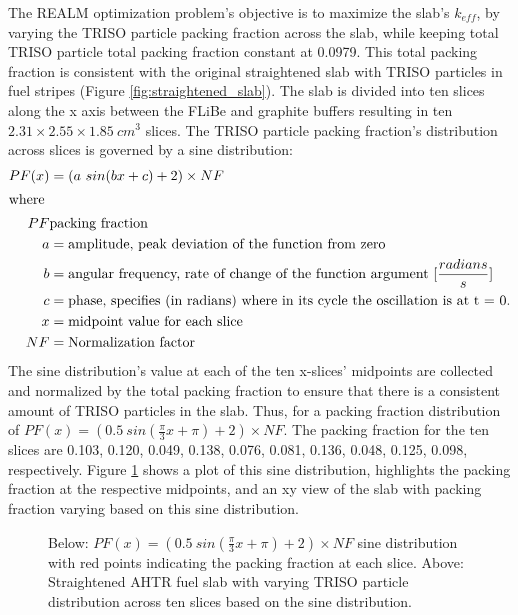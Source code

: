 The \gls{REALM} optimization problem's objective is to maximize the slab's 
$k_{eff}$, by varying the \gls{TRISO} particle packing fraction across the slab,
while keeping total \gls{TRISO} particle total packing fraction constant at 0.0979. 
This total packing fraction is consistent with the original straightened slab with 
TRISO particles in fuel stripes (Figure \ref{fig:straightened_slab}). 
The slab is divided into ten slices along the x axis between the \gls{FLiBe} and 
graphite buffers resulting in ten $2.31 \times 2.55 \times 1.85\ cm^3$ slices. 
The \gls{TRISO} particle packing fraction's distribution across slices is 
governed by a sine distribution: 
\begin{align}
    PF(x) &= (a\ sin(bx + c) + 2) \times NF\\
    \intertext{where}
    PF & \mbox{packing fraction} \nonumber \\ 
    a &= \mbox{amplitude, peak deviation of the function from zero} \nonumber \\
    b &= \mbox{angular frequency, rate of change of the function argument } [\frac{radians}{s}] \nonumber \\
    c &= \mbox{phase, specifies (in radians) where in its cycle the oscillation is at t = 0.} \nonumber \\
    x &= \mbox{midpoint value for each slice} \nonumber \\
    NF &= \mbox{Normalization factor} \nonumber
\end{align}
The sine distribution's value at each of the ten x-slices' midpoints are collected and 
normalized by the total packing fraction to ensure that there is a consistent 
amount of \gls{TRISO} particles in the slab. 
Thus, for a packing fraction distribution of 
$PF(x) = (0.5\ sin(\frac{\pi}{3}x + \pi) + 2)  \times NF$. 
The packing fraction for the ten slices are 0.103, 0.120, 0.049, 0.138, 
0.076, 0.081, 0.136, 0.048, 0.125, 0.098, respectively. 
Figure \ref{fig:triso_distribution} shows a plot of this sine distribution, highlights 
the packing fraction at the respective midpoints, and an xy view of the slab
with packing fraction varying based on this sine distribution. 
\begin{figure}[]
    \centering
    \caption{Below: $PF(x) = (0.5\ sin(\frac{\pi}{3}x + \pi) + 2)  \times NF$ 
    sine distribution with red points indicating the packing fraction at each slice. 
    Above: Straightened \acrlong{AHTR} fuel slab with varying \gls{TRISO} particle 
    distribution across ten slices based on the sine distribution. }
    \label{fig:triso_distribution}
\end{figure}

